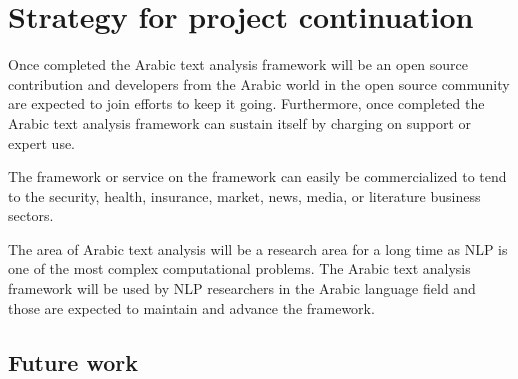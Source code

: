 \documentclass[12pt]{article}
\begin{document}
{\section{Strategy for project continuation}
\label{s:continue}


Once completed the Arabic text analysis framework will be 
an open source contribution and developers from the Arabic 
world in the open source community are expected to join 
efforts to keep it going.
Furthermore, once completed the Arabic text analysis framework 
can sustain itself by charging on support or expert use.

The framework or service on the framework can easily be 
commercialized to tend to the security, health, insurance, market,
news, media, or literature business sectors.
 
The area of Arabic text analysis will be a research area for 
a long time as NLP is one of the most complex computational 
problems.
The Arabic text analysis framework will be used by NLP 
researchers in the Arabic language field and those are 
expected to maintain and advance the framework.

\subsection{Future work}

}
\end{document}
